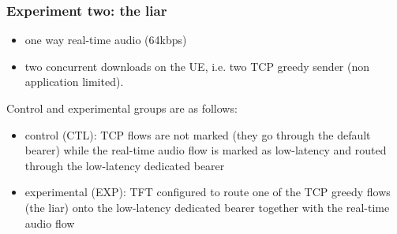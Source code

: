 \begin{frame}
\frametitle{Experiment two: the liar}

\begin{itemize}
\item one way real-time audio (64kbps)
\item two concurrent downloads on the UE, i.e. two TCP greedy sender (non application limited).
\end{itemize}
\vspace{.5cm}
Control and experimental groups are as follows:
\begin{itemize}
\item control (CTL): TCP flows are not marked (they go through the default bearer) while the real-time audio flow is marked as low-latency and routed through the low-latency dedicated bearer
\item experimental (EXP): TFT configured to route one of the TCP greedy flows (the liar) onto the low-latency dedicated bearer together with the real-time audio flow
\end{itemize}

\end{frame}
